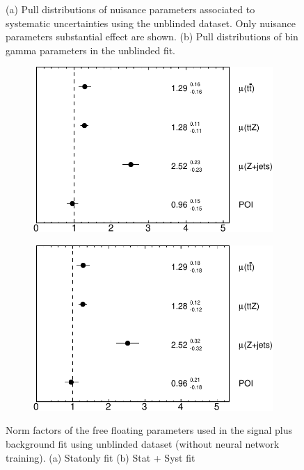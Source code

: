 \begin{figure}[!h]
\begin{subfigure}[b]{0.49\linewidth}
   \caption{}
   \label{fig:newgamma}
  \end{subfigure}
  \caption{(a) Pull distributions of nuisance parameters associated to systematic uncertainties using the unblinded dataset. Only nuisance parameters substantial effect are shown. (b) Pull distributions of bin gamma parameters in the unblinded fit.}
\end{figure}

\begin{figure}[!h] 
  \begin{subfigure}[b]{0.49\linewidth}
    \centering
    \includegraphics[width=\textwidth]{ubonn-thesis/Chapters/Chapters_08/appendix/data/NormFactors_statOnly-crop.pdf}
    \caption{}
    \label{fig:newnormfactoestat}
  \end{subfigure}%
  \begin{subfigure}[b]{0.49\linewidth}
    \centering
    \includegraphics[width=\textwidth]{ubonn-thesis/Chapters/Chapters_08/appendix/data/NormFactors-crop.pdf}
   \caption{}
   \label{fig:newnormfactor}
  \end{subfigure}
  \caption{Norm factors of the free floating parameters used in the signal plus background fit using unblinded dataset (without neural network training). (a) Statonly fit (b) Stat + Syst fit}
\end{figure}

